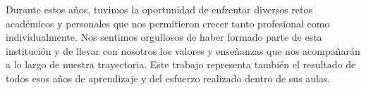 Durante estos años, tuvimos la oportunidad de enfrentar diversos retos académicos y personales que nos permitieron crecer tanto profesional como individualmente. Nos sentimos orgullosos de haber formado parte de esta institución y de llevar con nosotros los valores y enseñanzas que nos acompañarán a lo largo de nuestra trayectoria. Este trabajo representa también el resultado de todos esos años de aprendizaje y del esfuerzo realizado dentro de sus aulas.

\endinput
